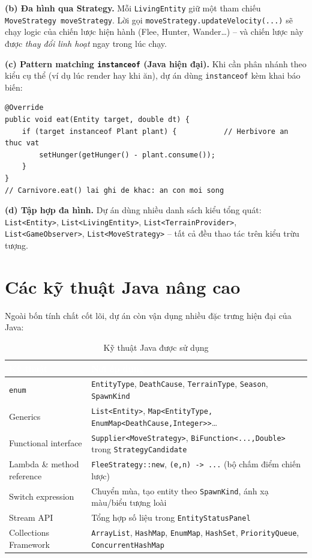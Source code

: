 \documentclass[12pt,a4paper]{report}
\newcommand{\code}[1]{\texttt{\small #1}}
\begin{document}
\textbf{(b) Đa hình qua Strategy.} Mỗi \code{LivingEntity} giữ một tham chiếu \code{MoveStrategy moveStrategy}. Lời gọi \code{moveStrategy.updateVelocity(...)} sẽ chạy logic của chiến lược hiện hành (Flee, Hunter, Wander\dots) -- và chiến lược này được \emph{thay đổi linh hoạt} ngay trong lúc chạy.

\textbf{(c) Pattern matching \code{instanceof} (Java hiện đại).} Khi cần phân nhánh theo kiểu cụ thể (ví dụ lúc render hay khi ăn), dự án dùng \code{instanceof} kèm khai báo biến:

\begin{lstlisting}[caption={Đa hình có điều kiện khi xác định hành vi ăn}]
@Override
public void eat(Entity target, double dt) {
    if (target instanceof Plant plant) {           // Herbivore an thuc vat
        setHunger(getHunger() - plant.consume());
    }
}
// Carnivore.eat() lai ghi de khac: an con moi song
\end{lstlisting}

\textbf{(d) Tập hợp đa hình.} Dự án dùng nhiều danh sách kiểu tổng quát: \code{List<Entity>}, \code{List<LivingEntity>}, \code{List<TerrainProvider>}, \code{List<GameObserver>}, \code{List<MoveStrategy>} -- tất cả đều thao tác trên kiểu trừu tượng.

\section{Các kỹ thuật Java nâng cao}

Ngoài bốn tính chất cốt lõi, dự án còn vận dụng nhiều đặc trưng hiện đại của Java:

\begin{table}[H]
\centering
\caption{Kỹ thuật Java được sử dụng}
\begin{tabular}{L{4cm} L{8.5cm}}
\toprule
{}\textcolor{white}{\textbf{Kỹ thuật}} & \textcolor{white}{\textbf{Nơi áp dụng}} \\
\midrule
\code{enum} & \code{EntityType}, \code{DeathCause}, \code{TerrainType}, \code{Season}, \code{SpawnKind} \\
 Generics & \code{List<Entity>}, \code{Map<EntityType, EnumMap<DeathCause,Integer>>}\dots \\
Functional interface & \code{Supplier<MoveStrategy>}, \code{BiFunction<...,Double>} trong \code{StrategyCandidate} \\
 Lambda \& method reference & \code{FleeStrategy::new}, \code{(e,n) -> ...} (bộ chấm điểm chiến lược) \\
Switch expression & Chuyển mùa, tạo entity theo \code{SpawnKind}, ánh xạ màu/biểu tượng loài \\
 Stream API & Tổng hợp số liệu trong \code{EntityStatusPanel} \\
Collections Framework & \code{ArrayList}, \code{HashMap}, \code{EnumMap}, \code{HashSet}, \code{PriorityQueue}, \code{ConcurrentHashMap} \\
\bottomrule
\end{tabular}
\end{table}
\end{document}
